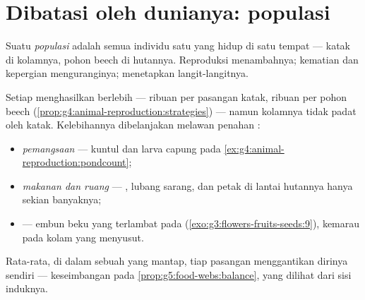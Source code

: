 \section{Dibatasi oleh dunianya: populasi}

\begin{definition}[Populasi]\label{def:g8:reproduction-and-environment:population}
Suatu \emph{populasi} adalah semua individu satu
 yang hidup di satu tempat --- katak di kolamnya, pohon beech di
hutannya. Reproduksi menambahnya; kematian dan kepergian
menguranginya;  menetapkan langit-langitnya.
\end{definition}

\begin{proposition}\label{prop:g8:reproduction-and-environment:limits}
Setiap  menghasilkan berlebih --- ribuan  per pasangan
katak, ribuan  per pohon beech
(\cref{prop:g4:animal-reproduction:strategies}) --- namun kolamnya
tidak padat oleh katak. Kelebihannya dibelanjakan melawan penahan
:
\begin{itemize}
  \item \emph{pemangsaan} --- kuntul dan larva capung pada
        \cref{ex:g4:animal-reproduction:pondcount};
  \item \emph{makanan dan ruang} --- , lubang sarang, dan petak
         di lantai hutannya hanya sekian banyaknya;
  \item \emph{} --- embun beku yang terlambat pada 
        (\cref{exo:g3:flowers-fruits-seeds:9}), kemarau pada kolam
         yang menyusut.
\end{itemize}
Rata-rata, di dalam sebuah  yang mantap, tiap pasangan
menggantikan dirinya sendiri --- keseimbangan pada
\cref{prop:g5:food-webs:balance}, yang dilihat dari sisi induknya.
\end{proposition}
\admitted

